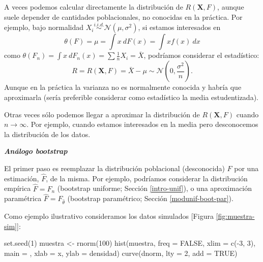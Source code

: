 \documentclass[
]{book}
\newenvironment{Shaded}{\begin{snugshade}}{\end{snugshade}}
\newcommand{\AttributeTok}[1]{\textcolor[rgb]{0.77,0.63,0.00}{#1}}
\newcommand{\ConstantTok}[1]{\textcolor[rgb]{0.00,0.00,0.00}{#1}}
\newcommand{\DecValTok}[1]{\textcolor[rgb]{0.00,0.00,0.81}{#1}}
\newcommand{\FunctionTok}[1]{\textcolor[rgb]{0.00,0.00,0.00}{#1}}
\newcommand{\NormalTok}[1]{#1}
\newcommand{\OtherTok}[1]{\textcolor[rgb]{0.56,0.35,0.01}{#1}}
\newcommand{\SpecialCharTok}[1]{\textcolor[rgb]{0.00,0.00,0.00}{#1}}
\newcommand{\StringTok}[1]{\textcolor[rgb]{0.31,0.60,0.02}{#1}}
\theoremstyle{break}
\theoremstyle{definition}
\theoremstyle{definition}
\theoremstyle{definition}
\theoremstyle{definition}
\theoremstyle{remark}
\begin{document}
A veces podemos calcular directamente la distribución de \(R\left( \mathbf{X},F \right)\),
aunque suele depender de cantidades poblacionales,
no conocidas en la práctica.
Por ejemplo, bajo normalidad \(X_i \overset{i.i.d.}{\sim} \mathcal{N}\left( \mu ,\sigma^2 \right)\), si estamos interesados en
\[\theta \left( F \right) =\mu =\int x~dF\left( x \right) =\int xf\left( x \right) ~dx\]
como \(\theta \left( F_n \right) = \int x~dF_n\left( x \right) = \sum \frac{1}{n}X_i = \bar{X}\), podríamos considerar el estadístico:
\[R=R\left( \mathbf{X},F \right) = \bar{X} - \mu \sim \mathcal{N}\left( 0 ,\frac{\sigma^2}{n} \right).\]
Aunque en la práctica la varianza no es normalmente conocida y habría que aproximarla
(sería preferible considerar como estadístico la media estudentizada).

Otras veces sólo podemos llegar a aproximar la distribución de
\(R\left( \mathbf{X},F \right)\) cuando \(n \rightarrow \infty\).
Por ejemplo, cuando estamos interesados en la media pero desconocemos la
distribución de los datos.

\textbf{\emph{Análogo bootstrap}}

El primer paso es reemplazar la distribución poblacional (desconocida) \(F\) por una
estimación, \(\hat{F}\), de la misma. Por ejemplo, podríamos considerar la
distribución empírica \(\hat{F}=F_n\) (bootstrap uniforme; Sección \ref{intro-unif}),
o una aproximación paramétrica \(\hat{F}=F_{\hat \theta}\) (bootstrap paramétrico; Sección \ref{modunif-boot-par}).

Como ejemplo ilustrativo consideramos los datos simulados {[}Figura \ref{fig:muestra-sim}{]}:

\begin{Shaded}
\begin{Highlighting}[]
\FunctionTok{set.seed}\NormalTok{(}\DecValTok{1}\NormalTok{)}
\NormalTok{muestra }\OtherTok{\textless{}{-}} \FunctionTok{rnorm}\NormalTok{(}\DecValTok{100}\NormalTok{)}
\FunctionTok{hist}\NormalTok{(muestra, }\AttributeTok{freq =} \ConstantTok{FALSE}\NormalTok{, }\AttributeTok{xlim =} \FunctionTok{c}\NormalTok{(}\SpecialCharTok{{-}}\DecValTok{3}\NormalTok{, }\DecValTok{3}\NormalTok{),}
     \AttributeTok{main =} \StringTok{\textquotesingle{}\textquotesingle{}}\NormalTok{, }\AttributeTok{xlab =} \StringTok{\textquotesingle{}x\textquotesingle{}}\NormalTok{, }\AttributeTok{ylab =} \StringTok{\textquotesingle{}densidad\textquotesingle{}}\NormalTok{)}
\FunctionTok{curve}\NormalTok{(dnorm, }\AttributeTok{lty =} \DecValTok{2}\NormalTok{, }\AttributeTok{add =} \ConstantTok{TRUE}\NormalTok{)}
\end{Highlighting}
\end{Shaded}
\end{document}
